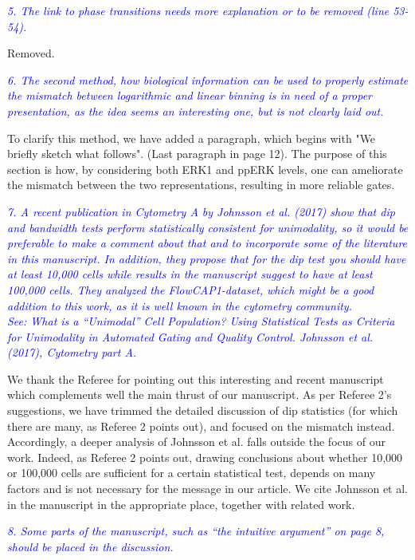 \documentclass[letter,11pt,draft]{article}
\newcommand{\re}[1]{\emph{\textcolor{blue}{#1}}}
\begin{document}
\smallskip
\re{5. The link to phase transitions needs more explanation or to be removed (line 53-54).}

\smallskip
Removed.

\re{6. The second method, how biological information can be used to properly estimate the mismatch between logarithmic and linear binning is in need of a proper presentation, as the idea seems an interesting one, but is not clearly laid out.}

\smallskip
To clarify this method, we have added a paragraph, which begins with "We briefly sketch what follows". (Last paragraph in page 12).
The purpose of this section is how, by considering both ERK1 and ppERK levels, one can ameliorate the mismatch between the two representations, resulting in more reliable gates. 

\re{7. A recent publication in Cytometry A by Johnsson et al. (2017) show that dip and bandwidth tests perform statistically consistent for unimodality, so it would be preferable to make a comment about that and to incorporate some of the literature in this manuscript. In addition, they propose that for the dip test you should have at least 10,000 cells while results in the manuscript suggest to have at least 100,000 cells. They analyzed the FlowCAP1-dataset, which might be a good addition to this work, as it is well known in the cytometry community.}
\\ 
\re{See: What is a “Unimodal” Cell Population? Using Statistical Tests as Criteria for Unimodality in Automated Gating and Quality Control. Johnsson et al. (2017), Cytometry part A.}

\smallskip
We thank the Referee for pointing out this interesting and recent manuscript which complements well the main thrust of our manuscript. As per Referee 2's suggestions, we have trimmed the detailed discussion of dip statistics (for which there are many, as Referee 2 points out), and focused on the mismatch instead. Accordingly, a deeper analysis of Johnsson et al. falls outside the focus of our work. Indeed, as Referee 2 points out, drawing conclusions about whether 10,000 or 100,000 cells are sufficient for a certain statistical test, depends on many factors and is not necessary for the message in our article. We cite Johnsson et al. in the manuscript in the appropriate place, together with related work. 

\re{
8. Some parts of the manuscript, such as “the intuitive argument” on page 8, should be placed in the discussion.}
\end{document}
